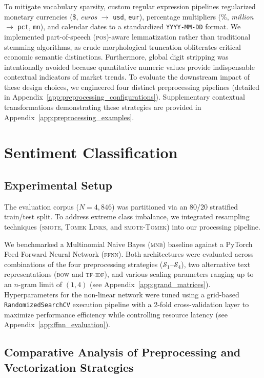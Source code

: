 \documentclass[manuscript,screen,review, nonacm]{acmart}
\begin{document}
To mitigate vocabulary sparsity, custom regular expression pipelines regularized monetary currencies (\$, \textit{euros} $\rightarrow$ \texttt{usd}, \texttt{eur}), percentage multipliers (\%, \textit{million} $\rightarrow$ \texttt{pct}, \texttt{mn}), and calendar dates to a standardized \texttt{YYYY-MM-DD} format. We implemented part-of-speech (\textsc{pos})-aware lemmatization rather than traditional stemming algorithms, as crude morphological truncation obliterates critical economic semantic distinctions. Furthermore, global digit stripping was intentionally avoided because quantitative numeric values provide indispensable contextual indicators of market trends. To evaluate the downstream impact of these design choices, we engineered four distinct preprocessing pipelines (detailed in Appendix~\ref{app:preprocessing_configurations}). Supplementary contextual transformations demonstrating these strategies are provided in Appendix~\ref{app:preprocessing_examples}.

\section{Sentiment Classification}

\subsection{Experimental Setup}
The evaluation corpus ($N = 4,846$) was partitioned via an 80/20 stratified train/test split. To address extreme class imbalance, we integrated resampling techniques (\textsc{smote}, \textsc{Tomek Links}, and \textsc{smote}-\textsc{Tomek}) into our processing pipeline.

We benchmarked a Multinomial Naive Bayes (\textsc{mnb}) baseline against a PyTorch Feed-Forward Neural Network (\textsc{ffnn}). Both architectures were evaluated across combinations of the four preprocessing strategies ($\mathcal{S}_1$--$\mathcal{S}_4$), two alternative text representations (\textsc{bow} and \textsc{tf-idf}), and various scaling parameters ranging up to an $n$-gram limit of $(1, 4)$ (see Appendix~\ref{app:grand_matrices}). Hyperparameters for the non-linear network were tuned using a grid-based \texttt{RandomizedSearchCV} execution pipeline with a 2-fold cross-validation layer to maximize performance efficiency while controlling resource latency (see Appendix~\ref{app:ffnn_evaluation}).

\subsection{Comparative Analysis of Preprocessing and Vectorization Strategies}
\end{document}
